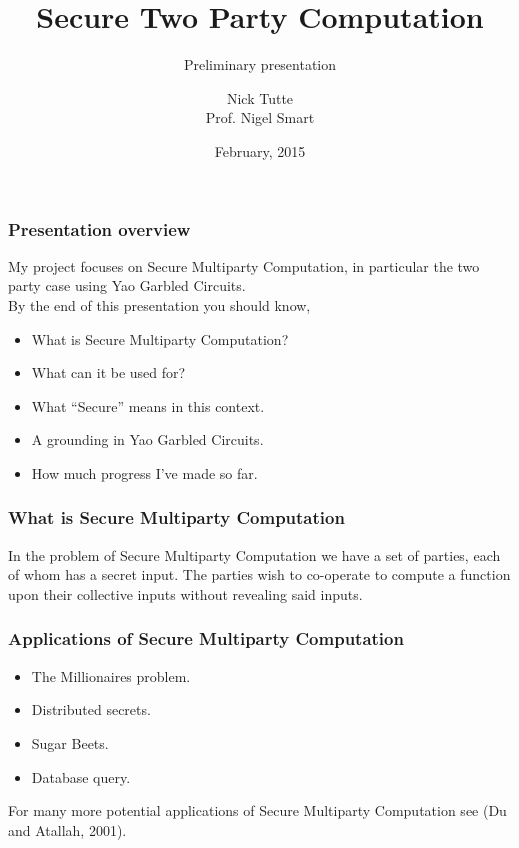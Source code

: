 \documentclass{beamer}
\begin{document}
	\title[Crisis]{Secure Two Party Computation}
	\subtitle{Preliminary presentation}
	\author[Author]{Nick Tutte\\[1ex]{\tiny Prof. Nigel Smart}}
	\date[Feb 2015]
	{February, 2015}
	\subject{Computer Science}
	\frame{\titlepage}


	\begin{frame}
		\frametitle{Presentation overview}
		My project focuses on Secure Multiparty Computation, in particular the two party case using Yao Garbled Circuits.\\

		By the end of this presentation you should know,
		\begin{itemize}
			\item What is Secure Multiparty Computation?
			\item What can it be used for?
			\item What ``Secure'' means in this context.
			\item A grounding in Yao Garbled Circuits.
			\item How much progress I've made so far.
		\end{itemize}

	\end{frame}


	\begin{frame}
		\frametitle{What is Secure Multiparty Computation}
		In the problem of Secure Multiparty Computation we have a set of parties, each of whom has a secret input. The parties wish to co-operate to compute a function upon their collective inputs without revealing said inputs.\\
		
	\end{frame}


	\begin{frame}
		\frametitle{Applications of Secure Multiparty Computation}
		\begin{itemize}
			\item The Millionaires problem.
			\item Distributed secrets.
			\item Sugar Beets.
			\item Database query.
		\end{itemize}
		
		For many more potential applications of Secure Multiparty Computation see (Du and Atallah, 2001).
	\end{frame}
\end{document}
